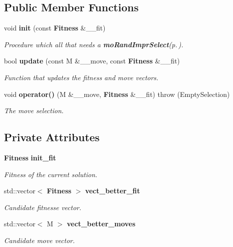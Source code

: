 \subsection*{Public Member Functions}
\begin{CompactItemize}
\item 
void {\bf init} (const {\bf Fitness} \&\_\-\_\-fit)
\begin{CompactList}\small\item\em Procedure which all that needs a {\bf mo\-Rand\-Impr\-Select}{\rm (p.\,\pageref{classmo_rand_impr_select})}. \item\end{CompactList}\item 
bool {\bf update} (const M \&\_\-\_\-move, const {\bf Fitness} \&\_\-\_\-fit)
\begin{CompactList}\small\item\em Function that updates the fitness and move vectors. \item\end{CompactList}\item 
void {\bf operator()} (M \&\_\-\_\-move, {\bf Fitness} \&\_\-\_\-fit)  throw (Empty\-Selection)
\begin{CompactList}\small\item\em The move selection. \item\end{CompactList}\end{CompactItemize}
\subsection*{Private Attributes}
\begin{CompactItemize}
\item 
{\bf Fitness} {\bf init\_\-fit}\label{classmo_rand_impr_select_d153c277a0a2ea95ac484210d445b40e}

\begin{CompactList}\small\item\em Fitness of the current solution. \item\end{CompactList}\item 
std::vector$<$ {\bf Fitness} $>$ {\bf vect\_\-better\_\-fit}\label{classmo_rand_impr_select_05c7c3b858e8a25632f2f5c86b0c97a3}

\begin{CompactList}\small\item\em Candidate fitnesse vector. \item\end{CompactList}\item 
std::vector$<$ M $>$ {\bf vect\_\-better\_\-moves}\label{classmo_rand_impr_select_2ace12bd179144fa71d56324694201f5}

\begin{CompactList}\small\item\em Candidate move vector. \item\end{CompactList}\end{CompactItemize}



